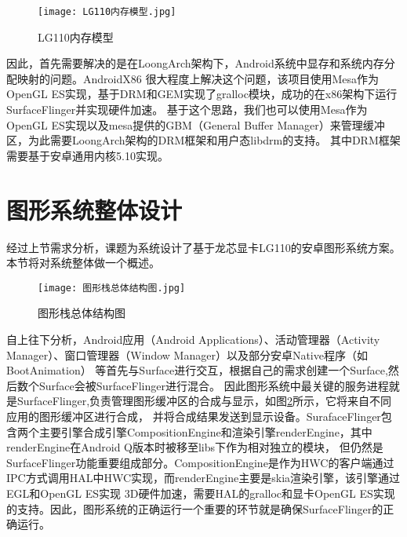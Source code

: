 \begin{figure}
  \centering
  \texttt{[image: LG110内存模型.jpg]}
  \caption{LG110内存模型}
  \label{fig:LG110内存模型}
\end{figure}

因此，首先需要解决的是在LoongArch架构下，Android系统中显存和系统内存分配映射的问题。AndroidX86\cite{AndroidX86}
很大程度上解决这个问题，该项目使用Mesa作为OpenGL ES实现，基于DRM和GEM实现了gralloc模块，成功的在x86架构下运行SurfaceFlinger并实现硬件加速\cite{XTYY201710015}。
基于这个思路，我们也可以使用Mesa作为OpenGL ES实现以及mesa提供的GBM（General Buffer Manager）来管理缓冲区，为此需要LoongArch架构的DRM框架和用户态libdrm的支持。
其中DRM框架需要基于安卓通用内核5.10实现。

\section{图形系统整体设计}
经过上节需求分析，课题为系统设计了基于龙芯显卡LG110的安卓图形系统方案。本节将对系统整体做一个概述。

\begin{figure}[h]
  \centering
  \texttt{[image: 图形栈总体结构图.jpg]}
  \caption{图形栈总体结构图}    
  \label{fig:图形栈总体结构图}
\end{figure}

自上往下分析，Android应用（Android Applications）、活动管理器（Activity Manager）、窗口管理器（Window Manager）以及部分安卓Native程序（如BootAnimation）
等首先与Surface进行交互，根据自己的需求创建一个Surface,然后数个Surface会被SurfaceFlinger进行混合\cite{邓凡平2011深入理解}。
因此图形系统中最关键的服务进程就是SurfaceFlinger,负责管理图形缓冲区的合成与显示，如图\ref{fig:图形栈总体结构图}所示，它将来自不同应用的图形缓冲区进行合成，
并将合成结果发送到显示设备。SurafaceFlinger包含两个主要引擎合成引擎CompositionEngine和渲染引擎renderEngine，其中renderEngine在Android Q版本时被移至libs下作为相对独立的模块，
但仍然是SurfaceFlinger功能重要组成部分。CompositionEngine是作为HWC的客户端通过IPC方式调用HAL中HWC实现，而renderEngine主要是skia渲染引擎，该引擎通过EGL和OpenGL ES实现
3D硬件加速，需要HAL的gralloc和显卡OpenGL ES实现的支持。因此，图形系统的正确运行一个重要的环节就是确保SurfaceFlinger的正确运行。


